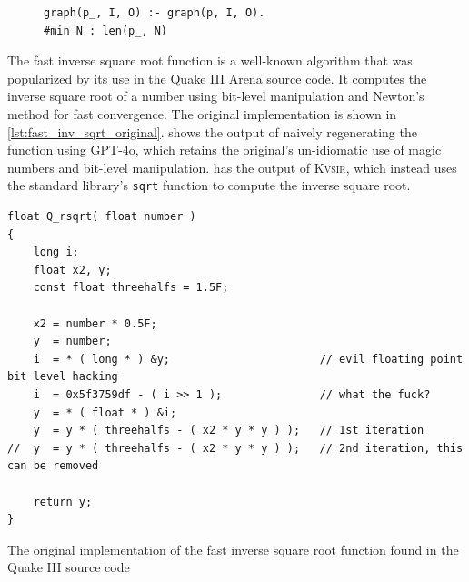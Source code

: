 \documentclass[sigplan,review,anonymous,10pt]{acmart}
\def\gptmodel{{GPT-4o}\xspace}
\newcommand{\sys}{{\scshape Kv{\textalpha}sir}\xspace}
\newcommand{\ttt}[1]{\texttt{#1}\xspace}
\begin{document}
\begin{figure}
\begin{verbatim}
graph(p_, I, O) :- graph(p, I, O).
#min N : len(p_, N)
\end{verbatim}
\end{figure}
The fast inverse square root function is a well-known algorithm that was
popularized by its use in the Quake III Arena source code.
It computes the inverse square root of a number using bit-level manipulation and
Newton's method for fast convergence.
The original implementation is shown in \cref{lst:fast_inv_sqrt_original}.
 shows the output of naively regenerating the function using \gptmodel,
which retains the original's un-idiomatic use of magic numbers and bit-level manipulation.
 has the output of \sys, which instead uses the standard library's
\ttt{sqrt} function to compute the inverse square root.

\begin{listing}[htpb]
\begin{verbatim}
float Q_rsqrt( float number )
{
	long i;
	float x2, y;
	const float threehalfs = 1.5F;

	x2 = number * 0.5F;
	y  = number;
	i  = * ( long * ) &y;                       // evil floating point bit level hacking
	i  = 0x5f3759df - ( i >> 1 );               // what the fuck?
	y  = * ( float * ) &i;
	y  = y * ( threehalfs - ( x2 * y * y ) );   // 1st iteration
//	y  = y * ( threehalfs - ( x2 * y * y ) );   // 2nd iteration, this can be removed

	return y;
}
\end{verbatim}
  \caption{The original implementation of the fast inverse square root function 
  found in the Quake III source code~\cite{fast_inv_sqrt}}
  \label{lst:fast_inv_sqrt_original}
\end{listing}
\end{document}
